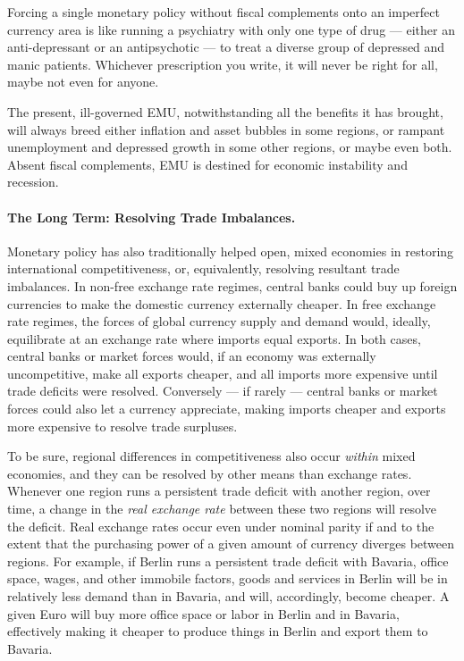 \documentclass[11pt,a4paper,oneside]{article}
\begin{document}
Forcing a single monetary policy without fiscal complements onto an imperfect currency area is like running a psychiatry with only one type of drug --- either an anti-depressant or an antipsychotic --- to treat a diverse group of depressed and manic patients.
Whichever prescription you write, it will never be right for all, maybe not even for anyone.

The present, ill-governed \gls{EMU}, notwithstanding all the benefits it has brought, will always breed either inflation and asset bubbles in some regions, or rampant unemployment and depressed growth in some other regions, or maybe even both. 
Absent fiscal complements, \gls{EMU} is destined for economic instability and recession.

\paragraph[Long Term]{The Long Term: 
Resolving Trade Imbalances.} 
Monetary policy has also traditionally helped open, mixed economies in restoring international competitiveness, or, equivalently, resolving resultant trade imbalances. 
In non-free exchange rate regimes, central banks could buy up foreign currencies to make the domestic currency externally cheaper. 
In free exchange rate regimes, the forces of global currency supply and demand would, ideally, equilibrate at an exchange rate where imports equal exports. In both cases, central banks or market forces would, if an economy was externally uncompetitive, make all exports cheaper, and all imports more expensive until trade deficits were resolved. 
Conversely --- if rarely --- central banks or market forces could also let a currency appreciate, making imports cheaper and exports more expensive to resolve trade surpluses.

To be sure, regional differences in competitiveness also occur \emph{within} mixed economies, and they can be resolved by other means than exchange rates. 
Whenever one region runs a persistent trade deficit with another region, over time, a change in the \emph{real exchange rate} between these two regions will resolve the deficit. 
Real exchange rates occur even under nominal parity if and to the extent that the purchasing power of a given amount of currency diverges between regions. 
For example, if Berlin runs a persistent trade deficit with Bavaria, office space, wages, and other immobile factors, goods and services in Berlin will be in relatively less demand than in Bavaria, and will, accordingly, become cheaper. 
A given Euro will buy more office space or labor in Berlin and in Bavaria, effectively making it cheaper to produce things in Berlin and export them to Bavaria.
\end{document}
